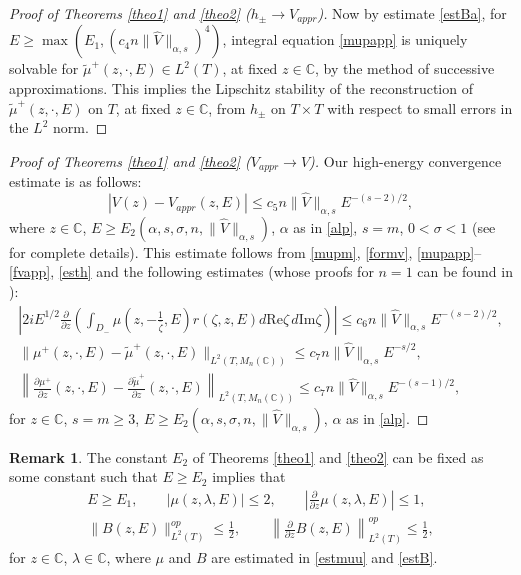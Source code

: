 \documentclass[11pt,a4paper,english,subeqn]{amsart}
\theoremstyle{plain}
\theoremstyle{definition}
\newtheorem{rem}[lem]{Remark}
\numberwithin{equation}{section}
\begin{document}
\begin{proof}[Proof of Theorems \ref{theo1} and \ref{theo2} ($h_{\pm} \longrightarrow V_{appr}$)]
Now by estimate \eqref{estBa}, for $E \geq \max(E_1, (c_4 n \| \widehat{V}\|_{\alpha,s})^4)$, integral equation \eqref{mupapp} is uniquely solvable for $\tilde{\mu}^+ (z, \cdot, E) \in L^2(T)$, at fixed $z \in {\mathbb{C}}$, by the method of successive approximations. This implies the Lipschitz stability of the reconstruction of $\tilde{\mu}^+(z, \cdot,E)$ on $T$, at fixed $z \in {\mathbb{C}}$, from $h_{\pm}$ on $T \times T$ with respect to small errors in the $L^2$ norm.
\end{proof}
\begin{proof}[Proof of Theorems \ref{theo1} and \ref{theo2} ($V_{appr} \longrightarrow V$)]
Our high-energy convergence estimate is as follows:
\begin{equation} \label{apprv}
|V(z) - V_{appr}(z,E)| \leq c_5 n \| \widehat{V}\|_{\alpha, s} E^{-(s-2)/2},
\end{equation}
where $z \in {\mathbb{C}}$, $E \geq E_2(\alpha,s,\sigma,n,\| \widehat{V}\|_{\alpha, s})$, $\alpha$ as in \eqref{alp}, $s=m$, $0< \sigma <1$ (see \cite{N4} for complete details). This estimate follows from \eqref{mupm}, \eqref{formv}, \eqref{mupapp}--\eqref{fvapp}, \eqref{esth} and the following estimates (whose proofs for $n=1$ can be found in \cite{N4}):
\begin{gather} 
\left| 2 i E^{1/2} \frac{\partial}{\partial z} \left( \int_{D_-}  \mu(z,-\frac{1}{\bar \zeta},E) r(\zeta, z,E) d{\mathrm{Re}} \zeta\, d {\mathrm{Im}} \zeta \right) \right| \leq c_6 n  \| \widehat{V}\|_{\alpha,s} E^{-(s-2)/2}, \\ \label{apprmu} 
\| \mu^+(z,\cdot, E) - \tilde \mu^+(z,\cdot, E)\|_{L^2(T, {M_{n}({\mathbb{C}})})} \leq c_7 n \| \widehat{V}\|_{\alpha, s} E^{-s/2}, \\
\left\| \frac{\partial \mu^+}{\partial z}(z,\cdot, E) - \frac{\partial \tilde \mu^+}{\partial z}(z,\cdot, E)\right\|_{L^2(T, {M_{n}({\mathbb{C}})})}\! \! \! \! \! \! \! \! \! \! \! \leq c_7 n \| \widehat{V}\|_{\alpha, s} E^{-(s-1)/2},
\end{gather}
for $z \in {\mathbb{C}}$, $s = m \geq 3$, $E \geq E_2(\alpha,s,\sigma,n,\| \widehat{V}\|_{\alpha, s})$,  $\alpha$ as in \eqref{alp}.
\end{proof}

\begin{rem} \label{63}
The constant $E_2$ of Theorems \ref{theo1} and \ref{theo2} can be fixed as some constant such that $E \geq E_2$ implies that
\begin{gather*}
E \geq E_1, \qquad |\mu(z,\lambda,E)| \leq 2, \qquad \left| \frac{\partial}{\partial z}\mu (z,\lambda,E)\right| \leq 1, \\
\|B(z,E)\|_{L^2(T)}^{op} \leq \frac{1}{2}, \qquad  \left\|\frac{\partial }{\partial z}B(z,E) \right\|_{L^2(T)}^{op} \leq \frac{1}{2},
\end{gather*}
for $z \in {\mathbb{C}}$, $\lambda \in {\mathbb{C}}$, where $\mu$ and $B$ are estimated in \eqref{estmuu} and \eqref{estB}.
\end{rem}
\end{document}
